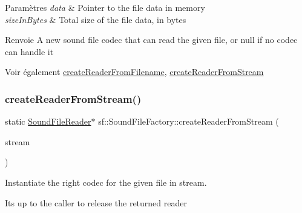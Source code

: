 \begin{DoxyParams}{Paramètres}
{\em data} & Pointer to the file data in memory \\
\hline
{\em size\+In\+Bytes} & Total size of the file data, in bytes\\
\hline
\end{DoxyParams}
\begin{DoxyReturn}{Renvoie}
A new sound file codec that can read the given file, or null if no codec can handle it
\end{DoxyReturn}
\begin{DoxySeeAlso}{Voir également}
\hyperlink{classsf_1_1SoundFileFactory_af0a87110e0b8a77aada17b22a016c066}{create\+Reader\+From\+Filename}, \hyperlink{classsf_1_1SoundFileFactory_a8d4b1f225b72a128ddba3be22f7ba5a2}{create\+Reader\+From\+Stream} 
\end{DoxySeeAlso}
\mbox{\label{classsf_1_1SoundFileFactory_a8d4b1f225b72a128ddba3be22f7ba5a2}} 
\subsubsection{\texorpdfstring{create\+Reader\+From\+Stream()}{createReaderFromStream()}}
{\footnotesize\ttfamily static \hyperlink{classsf_1_1SoundFileReader}{Sound\+File\+Reader}$\ast$ sf\+::\+Sound\+File\+Factory\+::create\+Reader\+From\+Stream (\begin{DoxyParamCaption}\item[{\hyperlink{classsf_1_1InputStream}{Input\+Stream} \&}]{stream }\end{DoxyParamCaption})\hspace{0.3cm}{\ttfamily [static]}}



Instantiate the right codec for the given file in stream. 

It\textquotesingle{}s up to the caller to release the returned reader


